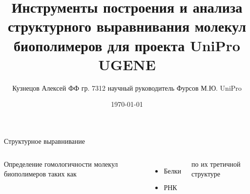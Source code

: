 \documentclass[utf8, professionalfonts]{beamer}
\title[Построение структурного выравнивания]{Инструменты построения и анализа структурного выравнивания молекул биополимеров для проекта UniPro UGENE}
\author[Кузнецов Алексей]{Кузнецов Алексей ФФ гр. 7312 \linebreak научный руководитель Фурсов М.Ю. UniPro}
\institute{Новосибирский Государственный Университет}
\date{\today}
\begin{document}

\begin{frame}
\titlepage
\end{frame}

\begin{frame}{Структурное выравнивание}
\begin{columns}[c]
	Определение гомологичности молекул биополимеров таких как
	\begin{itemize}
		\item Белки
		\item РНК
	\end{itemize}
	по их третичной структуре

\end{columns}

\end{frame}
\end{document}

